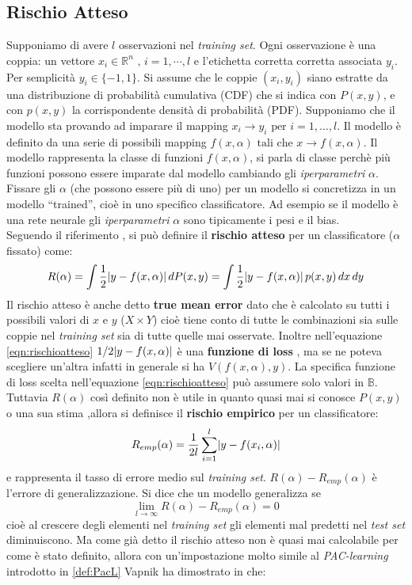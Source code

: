 \subsection{Rischio Atteso}
Supponiamo di avere $l$ osservazioni nel \textit{training set}. Ogni osservazione è una coppia: un vettore $x_{i} \in \mathbb{R}^{n} \text{ , } i=1,\cdots,l$ e l'etichetta corretta corretta associata $y_{i}$. Per semplicità $y_{i} \in \{-1,1\}$. Si assume che le coppie $(x_i,y_i)$ siano estratte da una distribuzione di probabilità cumulativa (CDF) che si indica con $P(x,y)$,  e con $p(x,y)$ la corrispondente densità di probabilità (PDF).  Supponiamo che il modello sta provando ad imparare il mapping $x_i \to y_i \text{ per } i=1,\dots,l$.  Il modello è definito da una serie di possibili mapping $f(x,\alpha) \text{ tali che } x \to f(x,\alpha) $. Il modello rappresenta la classe di funzioni $f(x,\alpha) $, si parla di classe perchè più funzioni possono essere imparate dal modello cambiando gli \textit{iperparametri} $\alpha$.  Fissare gli $\alpha$ (che possono essere più di uno) per un modello si concretizza in un modello ``trained'', cioè in uno specifico classificatore. Ad esempio se il modello è una rete neurale gli \textit{iperparametri} $\alpha$ sono tipicamente i pesi e il bias. \\ Seguendo il riferimento \cite{Vapnik95}, si può definire il \textbf{rischio atteso} per un classificatore ($\alpha$ fissato) come:
\begin{equation}
\label{eqn:rischioatteso}
R(\alpha) = \int \frac{1}{2} \lvert y-f(x,\alpha)\rvert \, dP(x,y) = \int \frac{1}{2} \lvert y-f(x,\alpha)\rvert \, p(x,y) \, dx \, dy
\end{equation}
Il rischio atteso è anche detto \textbf{true mean error}  dato che è calcolato su tutti i possibili valori di $x$ e $y$ ($X \times Y$) cioè tiene conto di tutte le combinazioni sia sulle coppie nel \textit{training set} sia di tutte quelle mai osservate. Inoltre nell'equazione \eqref{eqn:rischioatteso}  $1/2 \lvert y-f(x,\alpha)\rvert$ è una \textbf{funzione di loss} , ma se ne poteva scegliere un'altra infatti in generale si ha $V(f(x,\alpha),y)$. La specifica funzione di loss scelta nell'equazione \eqref{eqn:rischioatteso} può assumere solo valori in $\mathbb{B}$. Tuttavia $R(\alpha)$ così definito non è utile in quanto quasi mai si conosce $P(x,y)$ o una sua stima ,allora si definisce il \textbf{rischio empirico} per un classificatore:
\begin{equation*}
R_{emp}(\alpha) = \frac{1}{2l} \sum_{i=1}^{l}\lvert y-f(x_{i},\alpha)\rvert
\end{equation*}
e rappresenta il tasso di errore medio sul \textit{training set}. $R(\alpha) - R_{emp}(\alpha)$ è l'errore di generalizzazione. Si dice che un modello generalizza se
\begin{equation*}
\lim_{ l \to \infty} R(\alpha) - R_{emp}(\alpha) = 0
\end{equation*}   
cioè al crescere degli elementi nel \textit{training set} gli elementi mal predetti nel \textit{test set} diminuiscono. Ma come già detto il rischio atteso non è quasi mai calcolabile per come è stato definito, allora con un'impostazione molto simile al \textit{PAC-learning} introdotto in \ref{def:PacL} Vapnik ha dimostrato in \cite{Vapnik95}  che:

